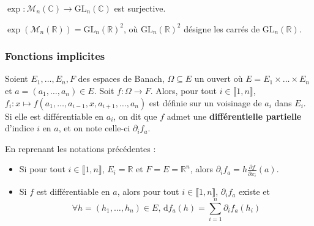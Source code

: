 
  \begin{theorem}
    $\exp : \mathcal{M}_n(\mathbb{C}) \rightarrow \mathrm{GL}_n(\mathbb{C})$ est surjective.
  \end{theorem}

  \begin{application}
    $\exp(\mathcal{M}_n(\mathbb{R})) = \mathrm{GL}_n(\mathbb{R})^2$, où $\mathrm{GL}_n(\mathbb{R})^2$ désigne les carrés de $\mathrm{GL}_n(\mathbb{R})$.
  \end{application}

  \subsubsection{Fonctions implicites}


  \begin{definition}
    Soient $E_1, \dots, E_n, F$ des espaces de Banach, $\Omega \subseteq E$ un ouvert où $E = E_1 \times \dots \times E_n$ et $a = (a_1, \dots, a_n) \in E$. Soit $f : \Omega \rightarrow F$. Alors, pour tout $i \in \llbracket 1, n \rrbracket$, $f_i : x \mapsto f(a_1, \dots, a_{i-1}, x, a_{i+1}, \dots, a_n)$ est définie sur un voisinage de $a_i$ dans $E_i$. Si elle est différentiable en $a_i$, on dit que $f$ admet une \textbf{différentielle partielle} d'indice $i$ en $a$, et on note celle-ci $\partial_i f_a$.
  \end{definition}

  \begin{remark}
    En reprenant les notations précédentes :
    \begin{itemize}
      \item Si pour tout $i \in \llbracket 1, n \rrbracket$, $E_i = \mathbb{R}$ et $F = E = \mathbb{R}^n$, alors $\partial_i f_a = h \frac{\partial f}{\partial x_i} (a)$.
      \item Si $f$ est différentiable en $a$, alors pour tout $i \in \llbracket 1, n \rrbracket$, $\partial_i f_a$ existe et
      \[ \forall h = (h_1, \dots, h_n) \in E, \, \mathrm{d}f_a(h) = \sum_{i=1}^{n} \partial_i f_a(h_i) \]
    \end{itemize}
  \end{remark}

